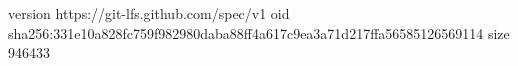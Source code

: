 version https://git-lfs.github.com/spec/v1
oid sha256:331e10a828fc759f982980daba88ff4a617c9ea3a71d217ffa56585126569114
size 946433

